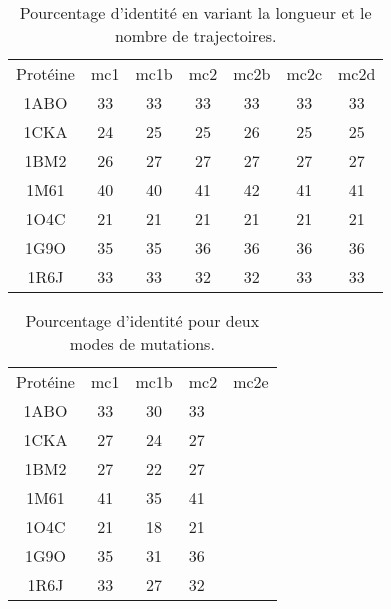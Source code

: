     \begin{table}[!htbp]
      \centering
      
      \begin{tabular}{ccccccc}

        \toprule
        Protéine & mc1 & mc1b & mc2  & mc2b & mc2c & mc2d  \\
        \cmidrule{1-7}      
        1ABO & 33 & 33 & 33 & 33 & 33  & 33 \\      
        1CKA & 24 & 25 & 25 & 26 & 25  & 25 \\  
        1BM2 & 26 & 27 & 27 & 27 & 27  & 27 \\  
        1M61 & 40 & 40 & 41 & 42 & 41  & 41 \\  
        1O4C & 21 & 21 & 21 & 21 & 21  & 21 \\  
        1G9O & 35 & 35 & 36 & 36 & 36  & 36 \\  
        1R6J & 33 & 33 & 32 & 32 & 33  & 33 \\  
        \bottomrule
      \end{tabular}
      

      \caption{Pourcentage d'identité en variant la longueur et le nombre de trajectoires.}      
      \label{tab:Traj_ident}
    \end{table}


    \begin{table}[!htbp]
      \centering
      
      \begin{tabular}{ccc}      
          \toprule
          Protéine & mc1 & mc1b & mc2 & mc2e \\
          
          1ABO & 33 & 30 & 33 & \\      
          1CKA & 27 & 24 & 27 & \\
          1BM2 & 27 & 22 & 27 & \\
          1M61 & 41 & 35 & 41 & \\
          1O4C & 21 & 18 & 21 & \\
          1G9O & 35 & 31 & 36 & \\
          1R6J & 33 & 27 & 32 & \\ 
          \bottomrule
          
        \end{tabular}
        
        \caption{Pourcentage d'identité pour deux modes de mutations. }      
        \label{tab:mut_ident}        
        \end{table}


